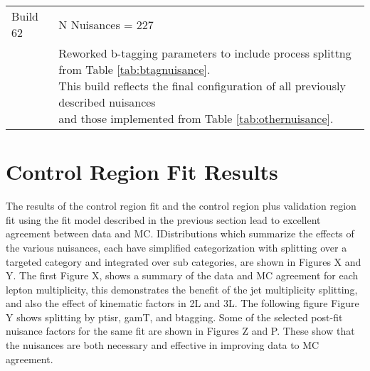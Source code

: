\begin{table}
\begin{tabular}{ll}
 & \\
\hline 
Build 62 & N Nuisances = 227 \\
\hline
 & \makecell[l]{Reworked b-tagging parameters to include process splittng from Table \ref{tab:btagnuisance}. \\ This build reflects the final configuration of all previously described nuisances \\ and those implemented from Table \ref{tab:othernuisance}. } \\
\end{tabular} 
\label{tab:builds}
\end{table}
\section{Control Region Fit Results}
The results of the control region fit and the control region plus validation region fit using the fit model described in the previous section lead to excellent agreement between data and MC. IDistributions which summarize the effects of the various nuisances, each have simplified categorization with splitting over a targeted category and integrated over sub categories, are shown in Figures X and Y. The first Figure X, shows a summary of the data and MC agreement for each lepton multiplicity, this demonstrates the benefit of the jet multiplicity splitting, and also the effect of kinematic factors in 2L and 3L. The following figure Figure Y shows splitting by ptisr, gamT, and btagging. Some of the selected post-fit nuisance factors for the same fit are shown in Figures Z and P. These show that the nuisances are both necessary and effective in improving data to MC agreement.






